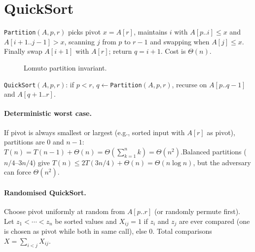 \section{QuickSort}
\label{sec:quicksort}

\texttt{Partition}$(A,p,r)$ picks pivot $x=A[r]$, maintains $i$ with $A[p..i]\le x$ and $A[i+1..j-1]>x$, scanning $j$ from $p$ to $r-1$ and swapping when $A[j]\le x$. Finally swap $A[i+1]$ with $A[r]$; return $q=i+1$. Cost is $\Theta(n)$.

\begin{figure}[h!]
\centering
{}
\caption{Lomuto partition invariant.}
\label{fig:qs-partition}
\end{figure}

\texttt{QuickSort}$(A,p,r)$: if $p<r$, $q\leftarrow$\texttt{Partition}$(A,p,r)$, recurse on $A[p..q-1]$ and $A[q+1..r]$.

\paragraph{Deterministic worst case.} If pivot is always smallest or largest (e.g., sorted input with $A[r]$ as pivot), partitions are $0$ and $n-1$: $T(n)=T(n-1)+\Theta(n)=\Theta(\sum_{k=1}^{n}k)=\Theta(n^2)$.\newline Balanced partitions ($n/4$--$3n/4$) give $T(n)\le 2T(3n/4)+\Theta(n)=\Theta(n\log n)$, but the adversary can force $\Theta(n^2)$.

\paragraph{Randomised QuickSort.} Choose pivot uniformly at random from $A[p..r]$ (or randomly permute first). Let $z_1<\cdots<z_n$ be sorted values and $X_{ij}=1$ if $z_i$ and $z_j$ are ever compared (one is chosen as pivot while both in same call), else $0$. Total comparisons $X=\sum_{i<j}X_{ij}$.

